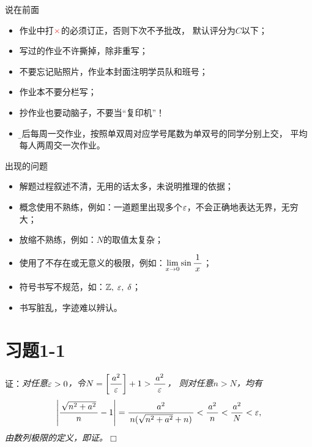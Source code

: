 
\titlepage

\begin{frame}{说在前面}
	\linespread{1.5}
	  \begin{itemize}[<+-|alert@+>]
	    \item 作业中打$\color{red}\times$的必须订正，否则下次不予批改，
		默认评分为$C$以下；
	    \item 写过的作业不许撕掉，除非重写；
	    \item 不要忘记贴照片，作业本封面注明学员队和班号；
	    \item 作业本不要分栏写；
	    \item 抄作业也要动脑子，不要当“复印机”！
	    \item {\b 今后每周一交作业，按照单双周对应学号尾数为单双号的同学分别上交，
	    平均每人两周交一次作业。} 
	  \end{itemize}
\end{frame}

\begin{frame}{出现的问题}
	\linespread{1.5}
	  \begin{itemize}[<+-|alert@+>]
	    \item 解题过程叙述不清，无用的话太多，未说明推理的依据；
	    \item 概念使用不熟练，例如：一道题里出现多个$\varepsilon$，不会正确地表达无界，无穷大；
	    \item 放缩不熟练，例如：$N$的取值太复杂；
	    \item 使用了不存在或无意义的极限，例如：$\lim\limits_{x\to{0}}\sin\displaystyle\frac{\,{1}\,}{\,{x}\,}$；
	    \item 符号书写不规范，如：$\mathbb{Z},\;\varepsilon,\;\delta$；
	    \item 书写脏乱，字迹难以辨认。
	  \end{itemize}
\end{frame}

\section{习题1-1}

\begin{frame}
	\linespread{1.5}
	\pause
	
	\bigskip
	
	证：\it 对任意$\varepsilon>0$，令$N=\left[\displaystyle\frac{\,{a^2}\,}{\,{\varepsilon}\,}\right]+1>\displaystyle\frac{\,{a^2}\,}{\,{\varepsilon}\,}$，
	则对任意$n>N$，均有
	$$\left|\displaystyle\frac{\,{\sqrt{n^2+a^2}}\,}{\,{n}\,}-1\right|
	=\displaystyle\frac{\,{a^2}\,}{\,{n(\sqrt{n^2+a^2}+n)}\,}<\displaystyle\frac{\,{a^2}\,}{\,{n}\,}<\displaystyle\frac{\,{a^2}\,}{\,{N}\,}<\varepsilon,
	$$
	由数列极限的定义，即证。\hfill$\Box$
\end{frame}

